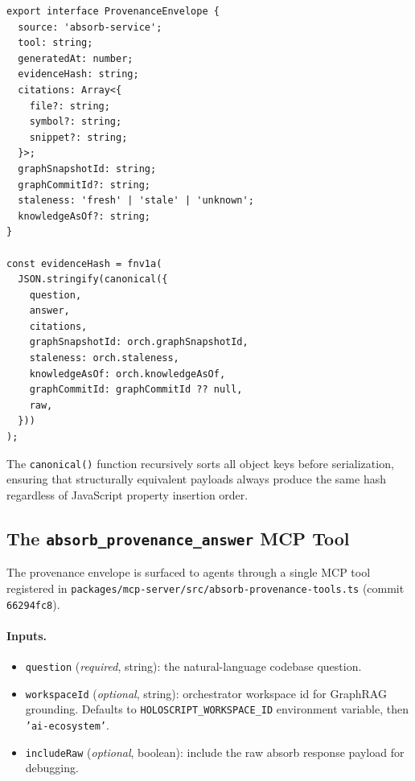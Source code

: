 \documentclass[conference]{IEEEtran}
\begin{document}
\begin{lstlisting}[caption={Provenance envelope interface and evidence
  hash construction, verbatim from
  \texttt{packages/mcp-server/src/absorb-provenance-tools.ts}
  (commit \texttt{66294fc8}).},
  label=lst:provenance-tool]
export interface ProvenanceEnvelope {
  source: 'absorb-service';
  tool: string;
  generatedAt: number;
  evidenceHash: string;
  citations: Array<{
    file?: string;
    symbol?: string;
    snippet?: string;
  }>;
  graphSnapshotId: string;
  graphCommitId?: string;
  staleness: 'fresh' | 'stale' | 'unknown';
  knowledgeAsOf?: string;
}

const evidenceHash = fnv1a(
  JSON.stringify(canonical({
    question,
    answer,
    citations,
    graphSnapshotId: orch.graphSnapshotId,
    staleness: orch.staleness,
    knowledgeAsOf: orch.knowledgeAsOf,
    graphCommitId: graphCommitId ?? null,
    raw,
  }))
);
\end{lstlisting}

The \texttt{canonical()} function recursively sorts all object keys
before serialization, ensuring that structurally equivalent payloads
always produce the same hash regardless of JavaScript property
insertion order.

\subsection{The \texttt{absorb\_provenance\_answer} MCP Tool}
\label{sec:impl:provenance-tool}

The provenance envelope is surfaced to agents through a single MCP tool
registered in \texttt{packages/mcp-server/src/absorb-provenance-tools.ts}
(commit \texttt{66294fc8}).

\paragraph{Inputs.}
\begin{itemize}
  \item \texttt{question} (\emph{required}, string): the natural-language
    codebase question.
  \item \texttt{workspaceId} (\emph{optional}, string): orchestrator
    workspace id for GraphRAG grounding. Defaults to
    \texttt{HOLOSCRIPT\_WORKSPACE\_ID} environment variable, then
    \texttt{'ai-ecosystem'}.
  \item \texttt{includeRaw} (\emph{optional}, boolean): include the raw
    absorb response payload for debugging.
\end{itemize}
\end{document}
